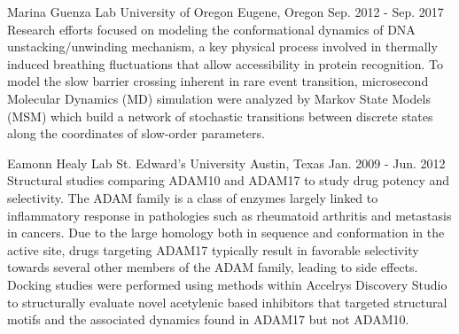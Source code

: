 

\begin{cventries}
  \cventry
    {Marina Guenza Lab}
    {University of Oregon}
    {Eugene, Oregon}
    {Sep. 2012 - Sep. 2017}
    {
      Research efforts focused on modeling the conformational dynamics of DNA unstacking/unwinding mechanism, a key physical process involved in thermally induced breathing fluctuations that allow accessibility in protein recognition. To model the slow barrier crossing inherent in rare event transition, microsecond Molecular Dynamics (MD) simulation were analyzed by Markov State Models (MSM) which build a network of stochastic transitions between discrete states along the coordinates of slow-order parameters.
    }
    
  \cventry
    {Eamonn Healy Lab}
    {St. Edward's University}
    {Austin, Texas}
    {Jan. 2009 - Jun. 2012}
    {
      Structural studies comparing ADAM10 and ADAM17 to study drug potency and selectivity. The ADAM family is a class of enzymes largely linked to inflammatory response in pathologies such as rheumatoid arthritis and metastasis in cancers. Due to the large homology both in sequence and conformation in the active site, drugs targeting ADAM17 typically result in favorable selectivity towards several other members of the ADAM family, leading to side effects.  Docking studies were performed using methods within Accelrys Discovery Studio to structurally evaluate novel acetylenic based inhibitors that targeted structural motifs and the associated dynamics found in ADAM17 but not ADAM10.
    }
\end{cventries}
